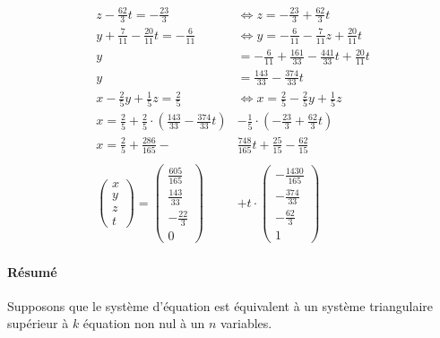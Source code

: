 \documentclass[
    11pt,
    a4paper,
    oneside,
    headinlcude, footinclude,
    twoside,
]{report}
\begin{document}
\[
    \begin{split}
        z - \frac{62}{3}t = - \frac{23}{3} &\iff z = - \frac{23}{3} + \frac{62}{3}t\\
        y + \frac{7}{11} - \frac{20}{11}  t = - \frac{6}{11} &\iff y = -
        \frac{6}{11} - \frac{7}{11}  z + \frac{20}{11}  t\\
        y &= - \frac{6}{11} + \frac{161}{33} - \frac{441}{33}  t +
        \frac{20}{11}  t\\
        y &= \frac{143}{33} - \frac{374}{33}  t\\
        x - \frac{2}{5}y + \frac{1}{5}z = \frac{2}{5} &\iff x = \frac{2}{5} -
        \frac{2}{5} y + \frac{1}{5}z\\
        x = \frac{2}{5} + \frac{2}{5} \cdot \left(\frac{143}{33} - \frac{374}{33}t\right)&
        - \frac{1}{5} \cdot \left( - \frac{23}{3} + \frac{62}{3} t\right)\\
        x = \frac{2}{5} + \frac{286}{165} - &\frac{748}{165} t + \frac{25}{15}
        - \frac{62}{15}\\
        \\
        \left(\begin{array}{c}x \\y \\z \\t\end{array}\right) = 
        \left(\begin{array}{c}\frac{605}{165} \\\frac{143}{33} \\-\frac{22}{3} \\0\end{array}\right)
            &+t \cdot
        \left(\begin{array}{c}-\frac{1430}{165} \\-\frac{374}{33} \\-\frac{62}{3} \\1\end{array}\right)
    \end{split}
\]

\paragraph{Résumé}
\label{par:resume}

Supposons que le système d'équation est équivalent à un système triangulaire
supérieur à $k$ équation non nul à un $n$ variables.
\end{document}
